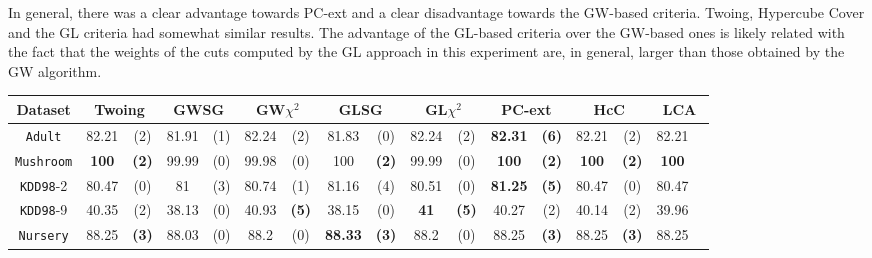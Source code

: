 In general, there was a clear advantage towards PC-ext and a clear disadvantage towards the GW-based criteria. Twoing, Hypercube Cover and the GL criteria had somewhat similar results. The advantage of the GL-based criteria over the GW-based ones is likely related with the fact that the weights of the cuts computed by the GL approach in this experiment are, in general, larger than those obtained by the GW algorithm.


\begin{sidewaystable*}[ph!]
\centering
\begin{tabular}{c|cc|cc|cc|cc|cc|cc|cc|cc} 
Dataset & \multicolumn{2}{c|}{Twoing} &  \multicolumn{2}{c|}{GWSG}  
&   \multicolumn{2}{c|}{GW$\chi^2$}                   &\multicolumn{2}{c|}{GLSG}       &\multicolumn{2}{c|}{GL$\chi^2$} & \multicolumn{2}{c|}{PC-ext} & \multicolumn{2}{c|}{HcC}& \multicolumn{2}{c}{LCA}\\
\hline 
{\tt Adult}         & 82.21    & (2)    & 81.91    & (1)    & 82.24    & (2)    & 81.83    & (0)    & 82.24    & (2)    &{\bf82.31}&{\bf(6)}          & 82.21    & (2)      & 82.21    &          \\
{\tt Mushroom}      & {\bf 100}&{\bf(2)}& 99.99    & (0)    & 99.98    & (0)    & 100      &{\bf(2)}& 99.99    & (0)    &{\bf 100} &{\bf(2)}          &{\bf100}  & {\bf(2)} & {\bf100} &          \\
{\tt KDD98}-2       & 80.47    & (0)    & 81       & (3)    & 80.74    & (1)    & 81.16    & (4)    & 80.51    & (0)    &{\bf81.25}&{\bf(5)}          & 80.47    & (0)      & 80.47    &          \\
{\tt KDD98}-9       & 40.35    & (2)    & 38.13    & (0)    & 40.93    &{\bf(5)}& 38.15    & (0)    &{\bf 41 } &{\bf(5)}& 40.27    & (2)              & 40.14    & (2)      & 39.96    &          \\
{\tt Nursery}       & 88.25    &{\bf(3)}& 88.03    & (0)    & 88.2     & (0)    &{\bf88.33}&{\bf(3)}& 88.2     & (0)    & 88.25    &{\bf(3)}          & 88.25    & {\bf(3)} & 88.25    &          \\

\end{tabular}
\end{sidewaystable*}
